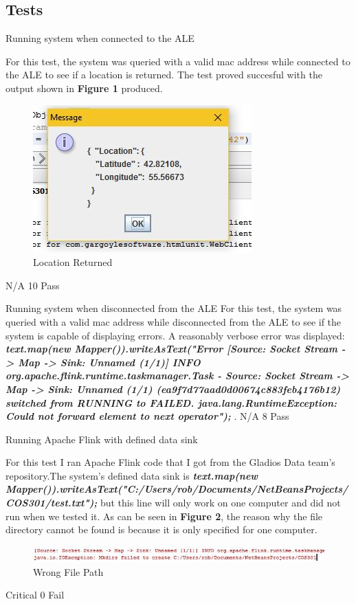 \subsection{Tests}

\FuncReq
{Running system when connected to the ALE}
{For this test, the system was queried with a valid mac address while connected to the ALE to see if a location is returned. The test proved succesful with the output shown in \textbf{Figure 1} produced.
			\begin{figure}[h]
				\centering
				\includegraphics{functional/images/right_mac.jpg}
				\caption{Location Returned}
				\label{fig:LocationReturned}
			\end{figure}
}
{N/A}
{10}
{Pass}

\FuncReq
{Running system when disconnected from the ALE}
{For this test, the system was queried with a valid mac address while disconnected from the ALE to see if the system is capable of displaying errors. A reasonably verbose error was displayed: \textbf{\textit{ text.map(new Mapper()).writeAsText("Error
[Source: Socket Stream -> Map -> Sink: Unnamed (1/1)] INFO org.apache.flink.runtime.taskmanager.Task - Source: Socket Stream -> Map -> Sink: Unnamed (1/1) (ea9f7d77aad0d00674c883feb4176b12) switched from RUNNING to FAILED.
java.lang.RuntimeException: Could not forward element to next operator");}} .}
{N/A}
{8}
{Pass}

\FuncReq
{Running Apache Flink with defined data sink}
{For this test I ran Apache Flink code that I got from the Gladios Data team's repository.The system's defined data sink is \textbf{\textit{  text.map(new Mapper()).writeAsText("C:/Users/rob/Documents/NetBeansProjects/COS301/test.txt");}} but this line will only work on one computer and did not run when we tested it. As can be seen in \textbf{Figure 2}, the reason why the file directory cannot be found is because it is only specified for one computer.
			\begin{figure}[h]
				\centering
				\includegraphics{functional/images/wrong_file_error.jpg}
				\caption{Wrong File Path}
				\label{fig:WrongFIlePath}
			\end{figure} }
{Critical}
{0}
{Fail}
		
